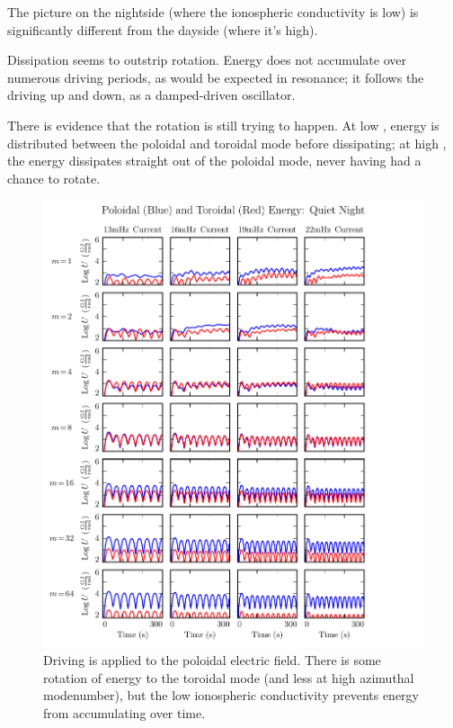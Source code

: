 

The picture on the nightside (where the ionospheric conductivity is low) is significantly different from the dayside (where it's high). 

Dissipation seems to outstrip rotation. Energy does not accumulate over numerous driving periods, as would be expected in resonance; it follows the driving up and down, as a damped-driven oscillator. 

There is evidence that the rotation is still trying to happen. At low \azm, energy is distributed between the poloidal and toroidal mode before dissipating; at high \azm, the energy dissipates straight out of the poloidal mode, never having had a chance to rotate. 

\begin{figure}[H]
    \centering
    \includegraphics[width=\textwidth]{figures/U_4.pdf}
    \caption[Poloidal and Toroidal Energy: Quiet Night]{
      Driving is applied to the poloidal electric field. There is some rotation of energy to the toroidal mode (and less at high azimuthal modenumber), but the low ionospheric conductivity prevents energy from accumulating over time. 
    }
    \label{fig_U_night}
\end{figure}

